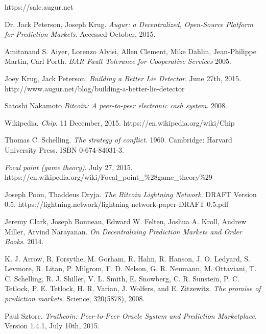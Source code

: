 \documentclass[onecolumn]{article}
\begin{document}
\onecolumn
\begin{thebibliography}{9}

	https://sale.augur.net

	Dr. Jack Peterson, Joseph Krug.
	\emph{Augur: a Decentralized, Open-Source Platform for Prediction Markets}.
	Accessed October, 2015.

	Amitanand S. Aiyer, Lorenzo Alvisi, Allen Clement, Mike Dahlin, Jean-Philippe Martin, Carl Porth.
	\emph{BAR Fault Tolerance for Cooperative Services}
	2005.

	Joey Krug, Jack Peterson.
	\emph{Building a Better Lie Detector}.
	June 27th, 2015. http://www.augur.net/blog/building-a-better-lie-detector

	Satoshi Nakamoto
	\emph{Bitcoin: A peer-to-peer electronic cash system}.
	2008.

	Wikipedia.
	\emph{Chip}.
	11 December, 2015.
	https://en.wikipedia.org/wiki/Chip

	Thomas C. Schelling.
	\emph{The strategy of conflict}.
	1960.
	Cambridge: Harvard University Press.
	ISBN 0-674-84031-3.

	\emph{Focal point (game theory)}.
	July 27, 2015. https://en.wikipedia.org/wiki/Focal\_point\_\%28game\_theory\%29

	Joseph Poon, Thaddeus Dryja.
	\emph{The Bitcoin Lightning Network}.
	DRAFT Version 0.5.
	https://lightning.network/lightning-network-paper-DRAFT-0.5.pdf

	Jeremy Clark, Joseph Bonneau, Edward W. Felten, Joshua A. Kroll, Andrew Miller, Arvind Narayanan.
	\emph{On Decentralizing Prediction Markets and Order Books}.
	2014.

	K. J. Arrow, R. Forsythe, M. Gorham, R. Hahn, R. Hanson, J. O. Ledyard, S. Levmore, R. Litan, P. Milgrom, F. D. Nelson, G. R. Neumann, M. Ottaviani, T. C. Schelling, R. J. Shiller, V. L. Smith, E. Snowberg, C. R. Sunstein, P. C. Tetlock, P. E. Tetlock, H. R. Varian, J. Wolfers, and E. Zitzewitz. 
	\emph{The promise of prediction markets}.
	Science, 320(5878), 2008.


	Paul Sztorc.
	\emph{Truthcoin: Peer-to-Peer Oracle System and Prediction Marketplace}.
	Version 1.4.1, July 10th, 2015.

\end{thebibliography}
\end{document}
